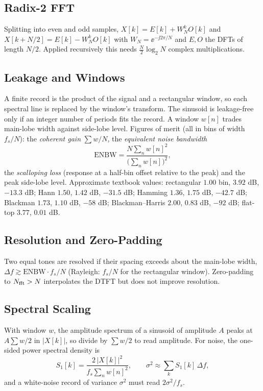 \documentclass[11pt,a4paper]{article}
\begin{document}
\subsection{Radix-2 FFT}
Splitting into even and odd samples, $X[k]=E[k]+W_N^kO[k]$ and $X[k+N/2]=E[k]-W_N^kO[k]$ with $W_N=\ee^{-\jj2\pi/N}$ and $E,O$ the DFTs of length $N/2$. Applied recursively this needs $\tfrac N2\log_2N$ complex multiplications.

\subsection{Leakage and Windows}
A finite record is the product of the signal and a rectangular window, so each spectral line is replaced by the window's transform. The sinusoid is leakage-free only if an integer number of periods fits the record. A window $w[n]$ trades main-lobe width against side-lobe level. Figures of merit (all in bins of width $f_s/N$): the \emph{coherent gain} $\sum w/N$, the \emph{equivalent noise bandwidth}
\begin{equation}
  \mathrm{ENBW}=\frac{N\sum_nw[n]^2}{\big(\sum_nw[n]\big)^2},
  \label{eq:enbw}
\end{equation}
the \emph{scalloping loss} (response at a half-bin offset relative to the peak) and the peak side-lobe level. Approximate textbook values: rectangular $1.00$ bin, $3.92$ dB, $-13.3$ dB; Hann $1.50$, $1.42$ dB, $-31.5$ dB; Hamming $1.36$, $1.75$ dB, $-42.7$ dB; Blackman $1.73$, $1.10$ dB, $-58$ dB; Blackman--Harris $2.00$, $0.83$ dB, $-92$ dB; flat-top $3.77$, $0.01$ dB.

\subsection{Resolution and Zero-Padding}
Two equal tones are resolved if their spacing exceeds about the main-lobe width, $\Delta f\gtrsim\mathrm{ENBW}\cdot f_s/N$ (Rayleigh: $f_s/N$ for the rectangular window). Zero-padding to $N_{\rm fft}>N$ interpolates the DTFT but does not improve resolution.

\subsection{Spectral Scaling}
With window $w$, the amplitude spectrum of a sinusoid of amplitude $A$ peaks at $A\sum w/2$ in $|X[k]|$, so divide by $\sum w/2$ to read amplitude. For noise, the one-sided power spectral density is
\begin{equation}
  S_1[k]=\frac{2\,|X[k]|^2}{f_s\sum_nw[n]^2},\qquad \sigma^2\approx\sum_kS_1[k]\,\Delta f,
  \label{eq:psd}
\end{equation}
and a white-noise record of variance $\sigma^2$ must read $2\sigma^2/f_s$.
\end{document}
